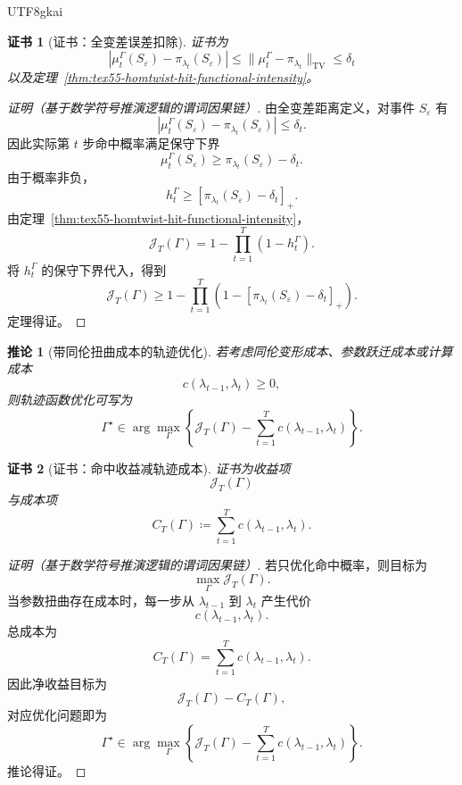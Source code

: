 \documentclass[12pt]{article}
\newtheorem{corollary}{推论}[section]
\newtheorem{Certificate}{证书}[section]
\newcommand{\DefEq}{\coloneqq}
\newcommand{\TV}{\mathrm{TV}}
\begin{document}
\begin{CJK*}{UTF8}{gkai}
\begin{Certificate}[证书：全变差误差扣除]
\label{cert:tex55-homtwist-frequency-trajectory}
证书为
\[
  |\mu_t^\Gamma(S_\varepsilon)-\pi_{\lambda_t}(S_\varepsilon)|
  \le
  \|\mu_t^\Gamma-\pi_{\lambda_t}\|_{\TV}
  \le
  \delta_t
\]
以及定理~\ref{thm:tex55-homtwist-hit-functional-intensity}。
\end{Certificate}

\begin{proof}[证明（基于数学符号推演逻辑的谓词因果链）]
由全变差距离定义，对事件 \(S_\varepsilon\) 有
\[
  |\mu_t^\Gamma(S_\varepsilon)-\pi_{\lambda_t}(S_\varepsilon)|
  \le
  \delta_t.
\]
因此实际第 \(t\) 步命中概率满足保守下界
\[
  \mu_t^\Gamma(S_\varepsilon)
  \ge
  \pi_{\lambda_t}(S_\varepsilon)-\delta_t.
\]
由于概率非负，
\[
  h_t^\Gamma
  \ge
  \left[
  \pi_{\lambda_t}(S_\varepsilon)-\delta_t
  \right]_+.
\]
由定理~\ref{thm:tex55-homtwist-hit-functional-intensity}，
\[
  \mathcal J_T(\Gamma)
  =
  1-\prod_{t=1}^{T}(1-h_t^\Gamma).
\]
将 \(h_t^\Gamma\) 的保守下界代入，得到
\[
  \mathcal J_T(\Gamma)
  \ge
  1-
  \prod_{t=1}^{T}
  \left(
  1-
  \left[
  \pi_{\lambda_t}(S_\varepsilon)-\delta_t
  \right]_+
  \right).
\]
定理得证。
\end{proof}

\begin{corollary}[带同伦扭曲成本的轨迹优化]
\label{cor:tex55-homtwist-cost-optimization}
若考虑同伦变形成本、参数跃迁成本或计算成本
\[
  c(\lambda_{t-1},\lambda_t)\ge0,
\]
则轨迹函数优化可写为
\[
  \boxed{
  \Gamma^\star
  \in
  \arg\max_{\Gamma}
  \left\{
  \mathcal J_T(\Gamma)
  -
  \sum_{t=1}^{T}
  c(\lambda_{t-1},\lambda_t)
  \right\}.
  }
\]
\end{corollary}

\begin{Certificate}[证书：命中收益减轨迹成本]
\label{cert:tex55-homtwist-cost-optimization}
证书为收益项
\[
  \mathcal J_T(\Gamma)
\]
与成本项
\[
  C_T(\Gamma)\DefEq\sum_{t=1}^{T}c(\lambda_{t-1},\lambda_t).
\]
\end{Certificate}

\begin{proof}[证明（基于数学符号推演逻辑的谓词因果链）]
若只优化命中概率，则目标为
\[
  \max_\Gamma \mathcal J_T(\Gamma).
\]
当参数扭曲存在成本时，每一步从 \(\lambda_{t-1}\) 到 \(\lambda_t\) 产生代价
\[
  c(\lambda_{t-1},\lambda_t).
\]
总成本为
\[
  C_T(\Gamma)=\sum_{t=1}^{T}c(\lambda_{t-1},\lambda_t).
\]
因此净收益目标为
\[
  \mathcal J_T(\Gamma)-C_T(\Gamma),
\]
对应优化问题即为
\[
  \Gamma^\star
  \in
  \arg\max_{\Gamma}
  \left\{
  \mathcal J_T(\Gamma)
  -
  \sum_{t=1}^{T}
  c(\lambda_{t-1},\lambda_t)
  \right\}.
\]
推论得证。
\end{proof}


\end{CJK*}
\end{document}
